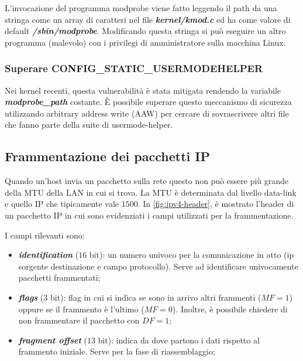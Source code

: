 \documentclass{article}
\begin{document}
L'invocazione del programma modprobe viene fatto leggendo il path da una stringa 
come un array di caratteri nel file \textbf{\textit{kernel/kmod.c}} ed ha come valore di 
default \textbf{\textit{/sbin/modprobe}}. Modificando questa stringa si può eseguire un 
altro programma (malevolo) con i privilegi di amministratore sulla macchina Linux. 

\subsubsection{Superare CONFIG\_STATIC\_USERMODEHELPER}
Nei kernel recenti, questa vulnerabilità è stata mitigata rendendo la variabile \textbf{\textit{modprobe\_path}} 
costante. È possibile superare questo meccanismo di sicurezza utilizzando arbitrary address write 
(AAW) per cercare di sovrascrivere altri file che fanno parte della suite di usermode-helper. 

\subsection{Frammentazione dei pacchetti IP}
Quando un'host invia un pacchetto sulla rete questo non può essere più grande della MTU 
della LAN in cui si trova. La MTU è determinata dal livello data-link e quello IP che 
tipicamente vale $1500$. In \cref{fig:ipv4-header}, è mostrato l'header di un pacchetto IP in cui sono 
evidenziati i campi utilizzati per la frammentazione. 

I campi rilevanti sono:
\begin{itemize}
  \item \textbf{\textit{identification}} ($16$ bit): un numero univoco per la comunicazione in atto (ip sorgente 
    destinazione e campo protocollo). Serve ad identificare univocamente pacchetti frammentati;
  \item \textbf{\textit{flags}} ($3$ bit): flag in cui si indica se sono in arrivo altri frammenti ($MF=1$) oppure 
    se il frammento è l'ultimo ($MF=0$). Inoltre, è possibile chiedere di non frammentare il 
    pacchetto con $DF=1$;
  \item \textbf{\textit{fragment offset}} ($13$ bit): indica da dove partono i dati rispetto 
    al frammento iniziale. Serve per la fase di riassemblaggio;
\end{itemize}
\end{document}
